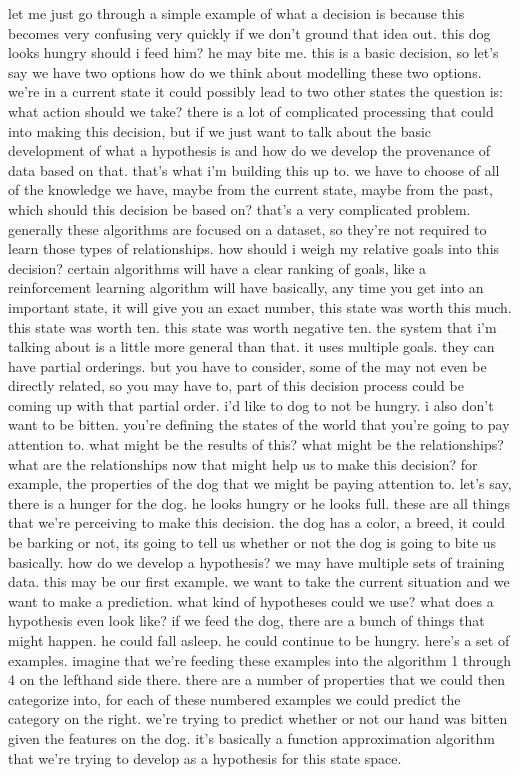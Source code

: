 let me just go through a simple example of what a decision is because this becomes very confusing very quickly if we don't ground that idea out.
this dog looks hungry should i feed him?
he may bite me.
this is a basic decision, so let's say we have two options
how do we think about modelling these two options.
we're in a current state
it could possibly lead to two other states
the question is: what action should we take?
there is a lot of complicated processing that could into making this decision, but if we just want to talk about the basic development of what a hypothesis is and how do we develop the provenance of data based on that.
that's what i'm building this up to.
we have to choose of all of the knowledge we have, maybe from the current state, maybe from the past, which should this decision be based on?
that's a very complicated problem.
generally these algorithms are focused on a dataset, so they're not required to learn those types of relationships.
how should i weigh my relative goals into this decision?
certain algorithms will have a clear ranking of goals, like a reinforcement learning algorithm will have basically, any time you get into an important state, it will give you an exact number, this state was worth this much.
this state was worth ten.
this state was worth negative ten.
the system that i'm talking about is a little more general than that.
it uses multiple goals.
they can have partial orderings.
but you have to consider, some of the may not even be directly related, so you may have to, part of this decision process could be coming up with that partial order.
i'd like to dog to not be hungry.
i also don't want to be bitten.
you're defining the states of the world that you're going to pay attention to.
what might be the results of this?
what might be the relationships?
what are the relationships now that might help us to make this decision?
for example, the properties of the dog that we might be paying attention to.
let's say, there is a hunger for the dog.
he looks hungry or he looks full.
these are all things that we're perceiving to make this decision.
the dog has a color, a breed, it could be barking or not, its going to tell us whether or not the dog is going to bite us basically.
how do we develop a hypothesis?
we may have multiple sets of training data.
this may be our first example.
we want to take the current situation and we want to make a prediction.
what kind of hypotheses could we use?
what does a hypothesis even look like?
if we feed the dog, there are a bunch of things that might happen.
he could fall asleep.
he could continue to be hungry.
here's a set of examples.
imagine that we're feeding these examples into the algorithm 1 through 4 on the lefthand side there.
there are a number of properties that we could then categorize into, for each of these numbered examples we could predict the category on the right.
we're trying to predict whether or not our hand was bitten given the features on the dog.
it's basically a function approximation algorithm that we're trying to develop as a hypothesis for this state space.

